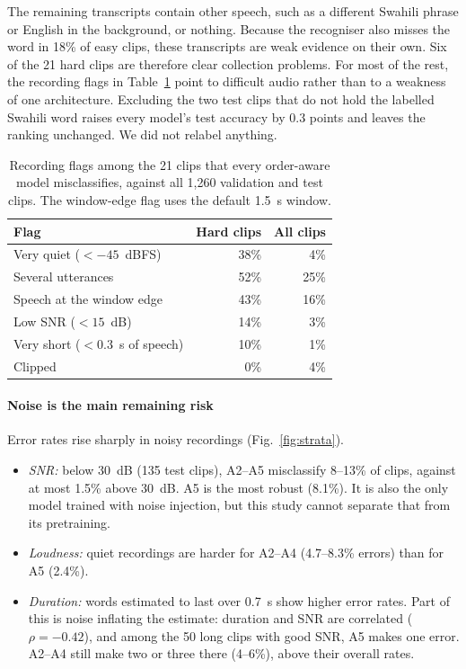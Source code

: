 The remaining transcripts contain other speech, such as a different Swahili phrase or English in the background, or
nothing. Because the recogniser also misses the word in 18\% of easy clips, these transcripts are weak evidence on
their own. Six of the 21 hard clips are therefore clear collection problems. For most of the rest, the recording
flags in Table~\ref{tab:hard} point to difficult audio rather than to a weakness of one architecture. Excluding the
two test clips that do not hold the labelled Swahili word raises every model's test accuracy by 0.3 points and leaves
the ranking unchanged. We did not relabel anything.

\begin{table}[t]
  \centering
  \caption{Recording flags among the 21 clips that every order-aware model misclassifies, against all 1,260
  validation and test clips. The window-edge flag uses the default 1.5~s window.}
  \label{tab:hard}
  \small
  \begin{tabular}{@{}lrr@{}}
    \toprule
    Flag & Hard clips & All clips \\
    \midrule
    Very quiet ($<-45$~dBFS) & 38\% & 4\% \\
    Several utterances & 52\% & 25\% \\
    Speech at the window edge & 43\% & 16\% \\
    Low SNR ($<15$~dB) & 14\% & 3\% \\
    Very short ($<0.3$~s of speech) & 10\% & 1\% \\
    Clipped & 0\% & 4\% \\
    \bottomrule
  \end{tabular}
\end{table}

\paragraph{Noise is the main remaining risk}
Error rates rise sharply in noisy recordings (Fig.~\ref{fig:strata}).
\begin{itemize}
  \item \emph{SNR:} below 30~dB (135 test clips), A2--A5 misclassify 8--13\% of clips, against at most 1.5\% above
        30~dB. A5 is the most robust (8.1\%). It is also the only model trained with noise injection, but this
        study cannot separate that from its pretraining.
  \item \emph{Loudness:} quiet recordings are harder for A2--A4 (4.7--8.3\% errors) than for A5 (2.4\%).
  \item \emph{Duration:} words estimated to last over 0.7~s show higher error rates. Part of this is noise
        inflating the estimate: duration and SNR are correlated ($\rho=-0.42$), and among the 50 long clips with good
        SNR, A5 makes one error. A2--A4 still make two or three there (4--6\%), above their overall rates.
\end{itemize}

